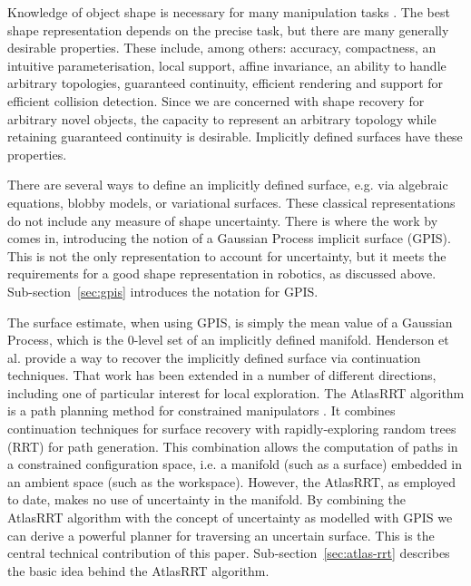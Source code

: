 
Knowledge of object shape is necessary for many manipulation tasks \cite{Bajcsy1989Machine}. The best shape representation depends on the precise task, but there are many generally desirable properties. These include, among others: accuracy, compactness, an intuitive parameterisation, local support, affine invariance, an ability to handle arbitrary topologies, guaranteed continuity, efficient rendering and support for efficient collision detection. Since we are concerned  with shape recovery for arbitrary novel objects, the capacity to represent an arbitrary topology while retaining guaranteed continuity is desirable. Implicitly defined surfaces have these properties.

There are several ways to define an implicitly defined surface, e.g. via algebraic equations, blobby models, or variational surfaces. These classical representations do not include any  measure of shape uncertainty. There is where the work by \cite{Williams2007Gaussian} comes in, introducing the notion of a Gaussian Process implicit surface (GPIS). This is not the only representation to account for uncertainty, but it meets the requirements for a good shape representation in robotics, as discussed above. Sub-section~\ref{sec:gpis} introduces the notation for GPIS.

The surface estimate, when using GPIS, is simply the mean value of a Gaussian Process, which is the $0$-level set of an implicitly defined manifold. Henderson et al. \cite{Henderson1993COMPUTING} provide a way to recover the implicitly defined surface via continuation techniques. That work has been extended in a number of different directions, including one of particular interest for local exploration. The AtlasRRT algorithm is a path planning method for constrained manipulators \cite{Jaillet2013Path}. It combines continuation techniques for surface recovery with rapidly-exploring random trees (RRT) \cite{LaValle2011Motion} for path generation. This combination allows the computation of paths in a constrained configuration space, i.e. a manifold (such as a surface) embedded in an ambient space (such as the workspace). However, the AtlasRRT, as employed to date, makes no use of uncertainty in the manifold. By combining the AtlasRRT algorithm with the concept of uncertainty as modelled with GPIS we can derive a powerful planner for traversing an uncertain surface. This is the central technical contribution of this paper. Sub-section~\ref{sec:atlas-rrt} describes the basic idea behind the AtlasRRT algorithm.


